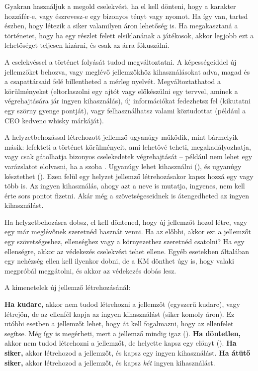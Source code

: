 Gyakran használjuk a megold cselekvést, ha el kell dönteni, hogy a karakter hozzáfér‑e, vagy észrevesz‑e egy bizonyos tényt vagy nyomot. Ha így van, tartsd észben, hogy létezik a siker valamilyen áron lehetőség is. Ha megakasztaná a történetet, hogy ha egy részlet felett elsiklanának a játékosok, akkor legjobb ezt a lehetőséget teljesen kizárni, és csak az árra fókuszálni.

\newpage


A  cselekvéssel a történet folyását tudod megváltoztatni. A képességeiddel új jellemzőket behozva, vagy meglévő jellemzőkhöz kihasználásokat adva, magad és a csapattársaid felé billentheted a mérleg nyelvét. Megváltoztathatod a körülményeket (eltorlaszolni egy ajtót vagy előkészülni egy tervvel, aminek a végrehajtására jár ingyen kihasználás), új információkat fedezhetsz fel (kikutatni egy szörny gyenge pontját), vagy felhasználhatsz valami köztudottat (például a CEO kedvenc whisky márkáját).

A helyzetbehozással létrehozott jellemző ugyanúgy működik, mint bármelyik másik: lefekteti a történet körülményeit, ami lehetővé teheti, megakadályozhatja, vagy csak gátolhatja bizonyos cselekedetek végrehajtását – például nem lehet egy varázslatot elolvasni, ha a szoba . Ugyanúgy lehet kihasználni (), és ugyanúgy késztethet (). Ezen felül egy helyzet jellemző létrehozásakor kapsz hozzá egy vagy több  is. Az ingyen kihasználás, ahogy azt a neve is mutatja, ingyenes, nem kell érte sors pontot fizetni. Akár még a szövetségeseidnek is átengedheted az ingyen kihasználást.

Ha helyzetbehozásra dobsz, el kell döntened, hogy új jellemzőt hozol létre, vagy egy már meglévőnek szeretnéd hasznát venni. Ha az előbbi, akkor ezt a jellemzőt egy szövetségeshez, ellenséghez vagy a környezethez szeretnéd csatolni? Ha egy ellenségre, akkor az védekezés cselekvést tehet ellene. Egyéb esetekben általában egy nehézség ellen kell ilyenkor dobni, de a KM dönthet úgy is, hogy valaki megpróbál meggátolni, és akkor az védekezés dobás lesz.

A kimenetelek új jellemző létrehozásánál:

\begin{itemize}
    \failureitem \textbf{Ha kudarc,} akkor nem tudod létrehozni a jellemzőt (egyszerű kudarc), vagy létrejön, de az ellenfél kapja az ingyen kihasználást (siker komoly áron). Ez utóbbi esetben a jellemzőt lehet, hogy át kell fogalmazni, hogy az ellenfelet segítse. Még így is megérheti, mert a jellemző mindig igaz ().
    \tieitem \textbf{Ha döntetlen,} akkor nem tudod létrehozni a jellemzőt, de helyette kapsz egy előnyt ().
    \successitem \textbf{Ha siker,} akkor létrehozod a jellemzőt, és kapsz egy ingyen kihasználást.
    \successwithstyleitem \textbf{Ha átütő siker,} akkor létrehozod a jellemzőt, és kapsz \emph{két} ingyen kihasználást.
\end{itemize}

